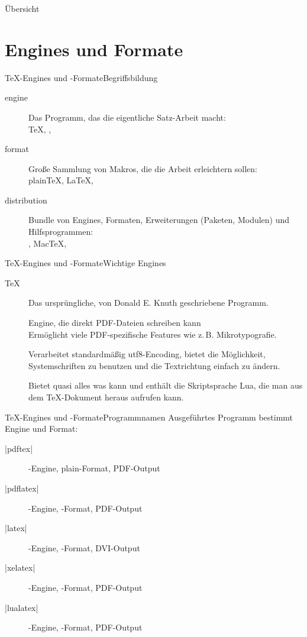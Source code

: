 \documentclass[
	vorläufig=false,
	aspectratio=1610,
	datum=2018-10-22,
	titel={Allgemeine Formatierung und Pakete},
	web=true,
	max,
]{../tex/latexkurs-slides}
\begin{document}
\begin{frame}{Übersicht}
	\tableofcontents
\end{frame}

\section{Engines und Formate}
\begin{frame}{\TeX-Engines und -Formate}{Begriffsbildung}
	\begin{description}
		\item[engine] Das Programm, das die eigentliche Satz-Arbeit macht:\\\TeX, , \luaTeX
		\item[format] Große Sammlung von Makros, die die Arbeit erleichtern sollen:\\plain\TeX, \LaTeX, 
		\item[distribution] Bundle von Engines, Formaten, Erweiterungen (Paketen, Modulen) und Hilfsprogrammen:\\\TeXlive, Mac\TeX, \MikTeX
	\end{description}
\end{frame}

\begin{frame}{\TeX-Engines und -Formate}{Wichtige Engines}
	\begin{description}
		\item[\TeX] Das ursprüngliche, von Donald E. Knuth geschriebene Programm.
		\item[] Engine, die direkt PDF-Dateien schreiben kann\\Ermöglicht viele PDF-spezifische Features wie z.\,B. Mikrotypografie.
		\item[\XeTeX] Verarbeitet standardmäßig utf8-Encoding, bietet die Möglichkeit, Systemschriften zu benutzen und die Textrichtung einfach zu ändern.
		\item[\luaTeX] Bietet quasi alles was \XeTeX kann und enthält die Skriptsprache Lua, die man aus dem \TeX-Dokument heraus aufrufen kann.
	\end{description}
\end{frame}

\begin{frame}[fragile]{\TeX-Engines und -Formate}{Programm\/namen}
	Ausgeführtes Programm bestimmt Engine und Format:\\[1em]
	\begin{description}
		\item[|pdftex|] -Engine, plain-Format, PDF-Output
		\item[|pdflatex|] -Engine, \LaTeXe-Format, PDF-Output
		\item[|latex|] -Engine, \LaTeXe-Format, DVI-Output
		\item[|xelatex|] \XeTeX-Engine, \LaTeXe-Format, PDF-Output
		\item[|lualatex|] \luaTeX-Engine, \LaTeXe-Format, PDF-Output
	\end{description}
\end{frame}
\end{document}
